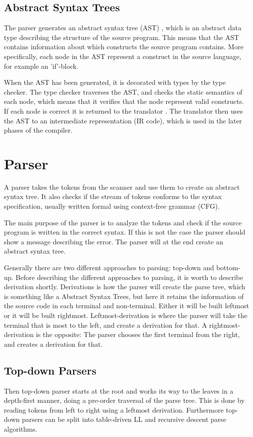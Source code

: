 \subsection{Abstract Syntax Trees}
The parser generates an abstract syntax tree (AST) \citep{CraftingACompiler}, which is an abstract data type describing the structure of the source program. This means that the AST contains information about which constructs the source program contains. More specifically, each node in the AST represent a construct in the source language, for example an 'if'-block.

When the AST has been generated, it is decorated with types by the type checker. The type checker traverses the AST, and checks the static semantics of each node, which means that it verifies that the node represent valid constructs. If each node is correct it is returned to the translator \citep{CraftingACompiler}. The translator then uses the AST to an intermediate representation (IR code), which is used in the later phases of the compiler.

\section{Parser}
A parser takes the tokens from the scanner and use them to create an abstract syntax tree. It also checks if the stream of tokens conforms to the syntax specification, usually written formal using context-free grammar (CFG).

The main purpose of the parser is to analyze the tokens and check if the source program is written in the correct syntax. If this is not the case the parser should show a message describing the error. The parser will at the end create an abstract syntax tree. 

Generally there are two different approaches to parsing: top-down and bottom-up. Before describing the different approaches to parsing, it is worth to describe derivation shortly. Derivations is how the parser will create the parse tree, %
which is something like a Abstract Syntax Trees, but here it retains the information of the source code in each terminal and non-terminal. %
Either it will be built leftmost or it will be built rightmost. Leftmost-derivation is where the parser will take the terminal that is most to the left, and create a derivation for that. A rightmost-derivation is the opposite: The parser chooses the first terminal from the right, and creates a derivation for that.

\subsection{Top-down Parsers}
Then top-down parser starts at the root and works its way to the leaves in a depth-first manner, doing a pre-order traversal of the parse tree. This is done by reading tokens from left to right using a leftmost derivation. Furthermore top-down parsers can be split into table-driven LL and recursive descent parse algorithms.


